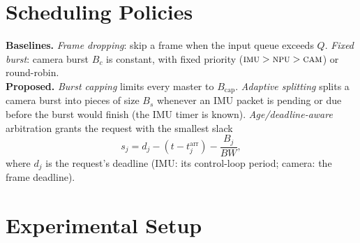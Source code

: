 \documentclass[conference]{IEEEtran}
\begin{document}
\section{Scheduling Policies}
\textbf{Baselines.} \textit{Frame dropping}: skip a frame when the input queue exceeds $Q$. \textit{Fixed burst}: camera burst $B_c$ is constant, with fixed priority ($\textsc{imu}>\textsc{npu}>\textsc{cam}$) or round-robin.\\
\textbf{Proposed.} \textit{Burst capping} limits every master to $B_{\mathrm{cap}}$. \textit{Adaptive splitting} splits a camera burst into pieces of size $B_s$ whenever an IMU packet is pending or due before the burst would finish (the IMU timer is known). \textit{Age/deadline-aware} arbitration grants the request with the smallest slack
\begin{equation}
s_j=d_j-(t-t_j^{\mathrm{arr}})-\frac{B_j}{BW},
\end{equation}
where $d_j$ is the request's deadline (IMU: its control-loop period; camera: the frame deadline).

\section{Experimental Setup}
\end{document}
